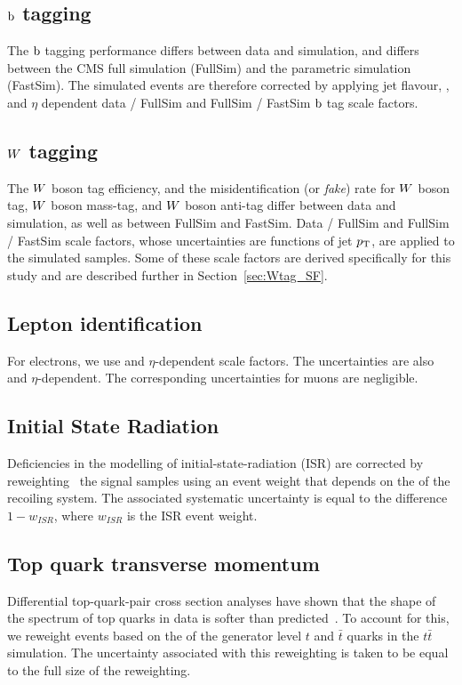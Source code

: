 \subsection{\texorpdfstring{$\mathrm{b}$}{b} tagging} 
The $\mathrm{b}$ tagging performance differs
between data and
simulation, and differs between the CMS full simulation (FullSim) and the parametric simulation
(FastSim).  The simulated events are therefore corrected by applying  jet flavour, \pt, and $\eta$
dependent data / FullSim and FullSim / FastSim $\mathrm{b}$ tag scale factors.

\subsection{\texorpdfstring{$W$}{W} tagging} 
The $W$ boson tag efficiency, and the
misidentification
(or \textit{fake}) rate for $W$ boson tag, $W$ boson mass-tag, and $W$ boson anti-tag differ
between data and simulation, as well as between FullSim and FastSim.  Data / FullSim and FullSim /
FastSim scale factors,  whose uncertainties are functions of jet $p_{\mathrm{T}}$, are applied to the simulated
samples.  Some of these scale factors are derived specifically for this study  and are described
further in Section~\ref{sec:Wtag_SF}.

\subsection{Lepton identification} 

For electrons, we use \pt and $\eta$-dependent scale factors.
The 
uncertainties
are also \pt and $\eta$-dependent.  The corresponding uncertainties for muons are negligible.  

\subsection{Initial State Radiation} 
Deficiencies in the modelling of
initial-state-radiation (ISR) 
are corrected by reweighting~\cite{ISRerr} the signal samples using an event weight 
that depends on the \pt of the recoiling system.  The associated systematic uncertainty is equal to
the difference $1 - w_{ISR}$, where $w_{ISR}$ is the ISR event weight.  

\subsection{Top quark transverse momentum} 
Differential top-quark-pair cross section
analyses have
shown that the shape of the \pt spectrum of  top quarks in data is softer than
predicted~\cite{toppt}. To account for this, we reweight events  based on the \pt of the generator
level $t$ and $\bar{t}$ quarks in the $t\bar{t}$ simulation.  
The uncertainty associated with this reweighting is taken to be equal to the full size of the
reweighting.

